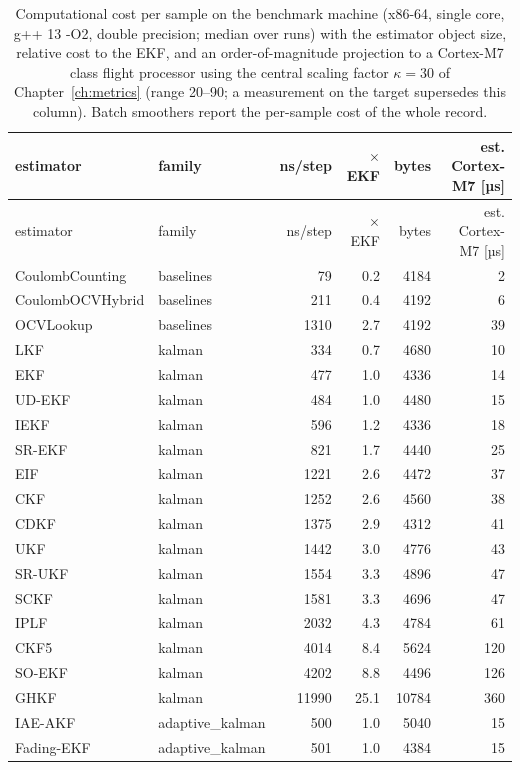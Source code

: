 \begin{longtable}{llrrrr}
\caption{Computational cost per sample on the benchmark machine (x86-64, single core, g++ 13 -O2, double precision; median over runs) with the estimator object size, relative cost to the EKF, and an order-of-magnitude projection to a Cortex-M7 class flight processor using the central scaling factor $\kappa = 30$ of Chapter~\ref{ch:metrics} (range 20--90; a measurement on the target supersedes this column). Batch smoothers report the per-sample cost of the whole record.}\label{tab:runtime}\\
\toprule estimator & family & ns/step & $\times$EKF & bytes & est. Cortex-M7 [µs] \\ \midrule\endfirsthead
\toprule estimator & family & ns/step & $\times$EKF & bytes & est. Cortex-M7 [µs] \\ \midrule\endhead
CoulombCounting & baselines & 79 & 0.2 & 4184 & 2 \\
CoulombOCVHybrid & baselines & 211 & 0.4 & 4192 & 6 \\
OCVLookup & baselines & 1310 & 2.7 & 4192 & 39 \\
LKF & kalman & 334 & 0.7 & 4680 & 10 \\
EKF & kalman & 477 & 1.0 & 4336 & 14 \\
UD-EKF & kalman & 484 & 1.0 & 4480 & 15 \\
IEKF & kalman & 596 & 1.2 & 4336 & 18 \\
SR-EKF & kalman & 821 & 1.7 & 4440 & 25 \\
EIF & kalman & 1221 & 2.6 & 4472 & 37 \\
CKF & kalman & 1252 & 2.6 & 4560 & 38 \\
CDKF & kalman & 1375 & 2.9 & 4312 & 41 \\
UKF & kalman & 1442 & 3.0 & 4776 & 43 \\
SR-UKF & kalman & 1554 & 3.3 & 4896 & 47 \\
SCKF & kalman & 1581 & 3.3 & 4696 & 47 \\
IPLF & kalman & 2032 & 4.3 & 4784 & 61 \\
CKF5 & kalman & 4014 & 8.4 & 5624 & 120 \\
SO-EKF & kalman & 4202 & 8.8 & 4496 & 126 \\
GHKF & kalman & 11990 & 25.1 & 10784 & 360 \\
IAE-AKF & adaptive\_kalman & 500 & 1.0 & 5040 & 15 \\
Fading-EKF & adaptive\_kalman & 501 & 1.0 & 4384 & 15 \\

\end{longtable}
